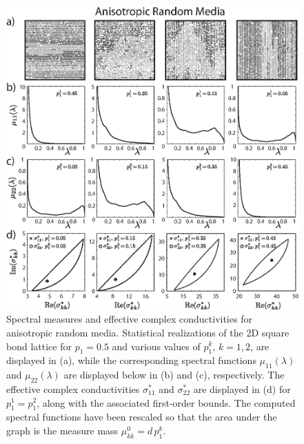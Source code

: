 \documentclass{cmslatex}
\begin{document}
%
\begin{figure}[t]
  \centerline{\includegraphics[scale=0.7]{Anisotropic_RRN_p=0_5.eps}} 
\caption{Spectral measures and effective complex conductivities for
  anisotropic random media. Statistical realizations of the 2D square
  bond lattice for $p_1=0.5$ and various values of $p_1^k$, $k=1,2$,
  are displayed in (a), while the corresponding spectral functions 
  $\mu_{11}(\lambda)$ and $\mu_{22}(\lambda)$ are displayed below in (b) and (c),
  respectively. The effective complex conductivities $\sigma^*_{11}$ and
  $\sigma^*_{22}$ are displayed in (d) for $p_1^1=p_1^2$, along with the
  associated first-order bounds. The computed spectral functions have
  been rescaled so that the area under the graph is the measure mass
  $\mu^0_{kk}=d\,p_1^k$.   
        }
\label{fig:Anisotropic_Spectral_Measures}
\end{figure}
%
\end{document}
